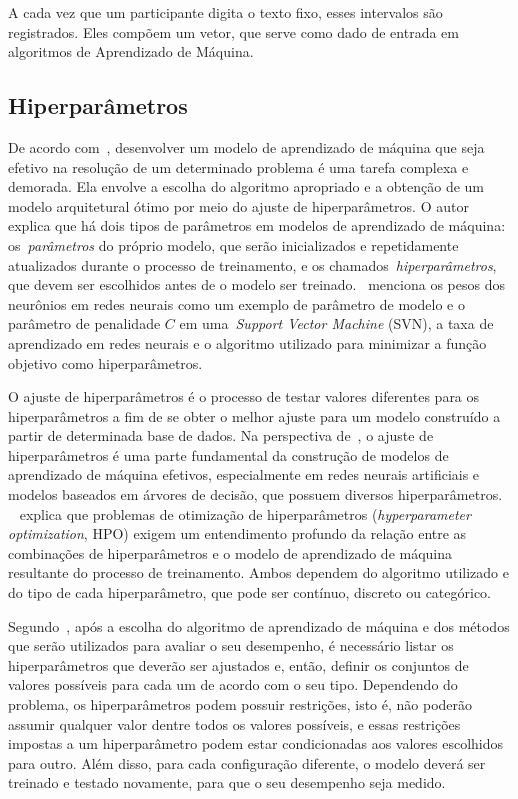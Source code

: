 A cada vez que um participante digita o texto fixo, esses intervalos são registrados. Eles compõem um vetor, que serve como dado de entrada em algoritmos de Aprendizado de Máquina. 


\subsection{Hiperparâmetros}\label{subsec:ajuste_de_hiperparametros}

De acordo com~, desenvolver um modelo de aprendizado de máquina que seja efetivo na resolução de um determinado problema é uma tarefa complexa e demorada. Ela envolve a escolha do algoritmo apropriado e a obtenção de um modelo arquitetural ótimo por meio do ajuste de hiperparâmetros. O autor explica que há dois tipos de parâmetros em modelos de aprendizado de máquina: os~\textit{parâmetros} do próprio modelo, que serão inicializados e repetidamente atualizados durante o processo de treinamento, e os chamados~\textit{hiperparâmetros}, que devem ser escolhidos antes de o modelo ser treinado.~ menciona os pesos dos neurônios em redes neurais como um exemplo de parâmetro de modelo e o parâmetro de penalidade $C$ em uma~\textit{Support Vector Machine} (SVN), a taxa de aprendizado em redes neurais e o algoritmo utilizado para minimizar a função objetivo como hiperparâmetros.

O ajuste de hiperparâmetros é o processo de testar valores diferentes para os hiperparâmetros a fim de se obter o melhor ajuste para um modelo construído a partir de determinada base de dados. Na perspectiva de~, o ajuste de hiperparâmetros é uma parte fundamental da construção de modelos de aprendizado de máquina efetivos, especialmente em redes neurais artificiais e modelos baseados em árvores de decisão, que possuem diversos hiperparâmetros.
~ explica que problemas de otimização de hiperparâmetros (\textit{hyperparameter optimization}, HPO) exigem um entendimento profundo da relação entre as combinações de hiperparâmetros e o modelo de aprendizado de máquina resultante do processo de treinamento. Ambos dependem do algoritmo utilizado e do tipo de cada hiperparâmetro, que pode ser contínuo, discreto ou categórico.

Segundo~, após a escolha do algoritmo de aprendizado de máquina e dos métodos que serão utilizados para avaliar o seu desempenho, é necessário listar os hiperparâmetros que deverão ser ajustados e, então, definir os conjuntos de valores possíveis para cada um de acordo com o seu tipo. Dependendo do problema, os hiperparâmetros podem possuir restrições, isto é, não poderão assumir qualquer valor dentre todos os valores possíveis, e essas restrições impostas a um hiperparâmetro podem estar condicionadas aos valores escolhidos para outro. Além disso, para cada configuração diferente, o modelo deverá ser treinado e testado novamente, para que o seu desempenho seja medido.

